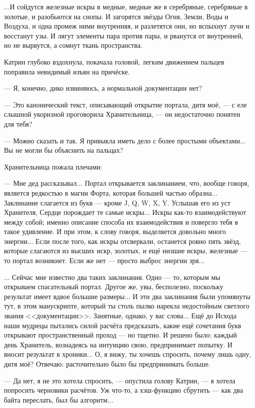 ...И сойдутся железные искры в медные, медные же в серебряные, серебряные в золотые, и разобьются на снопы.
И загорятся звёзды Огня, Земли, Воды и Воздуха, и одна промеж ними внутренняя, и разлетятся они, но вспыхнут лучи и восстанут узы.
И лягут элементы пара против пары, и рванутся от внутренней, но не вырвутся, а сомнут ткань пространства.

Катрин глубоко вздохнула, покачала головой, легким движением пальцев поправила невидимый изъян на причёске.

--- Я, конечно, дико извиняюсь, а нормальной документации нет?

--- Это канонический текст, описывающий открытие портала, дитя моё, --- с еле слышной укоризной проговорила Хранительница,
--- он недостаточно понятен для тебя?

--- Можно сказать и так. Я привыкла иметь дело с более простыми объектами... Вы не могли бы объяснить на пальцах?

Хранительница пожала плечами:

--- Мне дед рассказывал... Портал открывается заклинанием, что, вообще говоря, является редкостью в магии Форта,
которая большей частью образна... Заклинание слагается из букв --- кроме J, Q, W, X, Y.
Услышав его из уст Хранителя, Сердце порождает те самые искры... Искры как-то взаимодействуют между собой;
именно описание способа их взаимодействия и повергло тебя в такое удивление.
И при этом, к слову говоря, выделяется довольно много энергии...
Если после того, как искры отсверкали, останется ровно пять звёзд, которые слагаются из высших искр,
золотых, и ещё низшие искры, железные --- то портал возникнет. Если же нет --- просто выброс энергии зря...

... Сейчас мне известно два таких заклинания. Одно --- то, которым мы открываем спасательный портал.
Другое же, увы, бесполезно, поскольку результат имеет вдвое большие размеры...
И эти два заклинания были упомянуты тут, в этом манускрипте,
который ты столь пылко нарекла недостойным светлого звания <<документации>>. Занятные, однако, у вас слова...
Ещё до Исхода наши мудрецы пытались силой расчёта предсказать,
какие ещё сочетания букв открывают пространственный проход --- но тщетно.
И решено было: каждый день Хранитель, вознадеясь на интуицию свою, предпринимает попытку. И вносит результат в хроники...
О, я вижу, ты хочешь спросить, почему лишь одну, дитя моё? Отвечаю: расточительно было бы предпринимать больше.

--- Да нет, я не это хотела спросить, --- опустила голову Катрин, --- я хотела попросить черновики расчётов.
Уж что-то, а хэш-функцию сбрутить --- как два байта переслать, был бы алгоритм...

